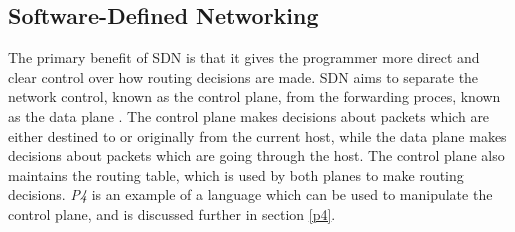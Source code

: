 \subsection{Software-Defined Networking}
\label{software_defined_networking}



The primary benefit of SDN is that it gives the programmer more direct and clear control over how routing decisions are made. SDN aims to separate the network control, known as the control plane, from the forwarding proces, known as the data plane \cite{software_defined_networking_survey}. The control plane makes decisions about packets which are either destined to or originally from the current host, while the data plane makes decisions about packets which are going through the host. The control plane also maintains the routing table, which is used by both planes to make routing decisions. \textit{P4} is an example of a language which can be used to manipulate the control plane, and is discussed further in section \ref{p4}.
